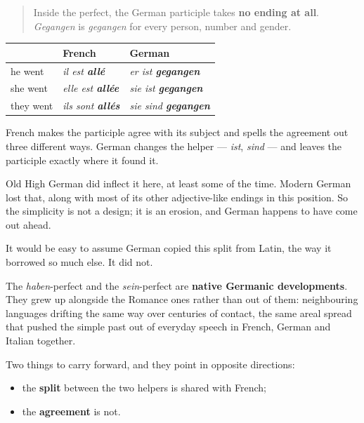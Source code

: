 \begin{grammarlens}[title={Grammar Lens: German agrees with nothing here}]
\begin{quote}
Inside the perfect, the German participle takes \textbf{no ending at all}. \emph{Gegangen} is \emph{gegangen} for every person, number and gender.
\end{quote}

\noindent
\begin{tabularx}{\linewidth}{@{}>{\raggedright\arraybackslash}X>{\raggedright\arraybackslash}X>{\raggedright\arraybackslash}X@{}}
\toprule
\textbf{} & \textbf{French} & \textbf{German} \\
\midrule
he went & \emph{il est \textbf{allé}} & \emph{er ist \textbf{gegangen}} \\
she went & \emph{elle est \textbf{allée}} & \emph{sie ist \textbf{gegangen}} \\
they went & \emph{ils sont \textbf{allés}} & \emph{sie sind \textbf{gegangen}} \\
\bottomrule
\end{tabularx}

French makes the participle agree with its subject and spells the agreement out three different ways. German changes the helper — \emph{ist}, \emph{sind} — and leaves the participle exactly where it found it.

Old High German did inflect it here, at least some of the time. Modern German lost that, along with most of its other adjective-like endings in this position. So the simplicity is not a design; it is an erosion, and German happens to have come out ahead.
\end{grammarlens}

\begin{culture}
It would be easy to assume German copied this split from Latin, the way it borrowed so much else. It did not.

The \emph{haben}-perfect and the \emph{sein}-perfect are \textbf{native Germanic developments}. They grew up alongside the Romance ones rather than out of them: neighbouring languages drifting the same way over centuries of contact, the same areal spread that pushed the simple past out of everyday speech in French, German and Italian together.

Two things to carry forward, and they point in opposite directions:

\begin{itemize}
\raggedright
  \item the \textbf{split} between the two helpers is shared with French;
  \item the \textbf{agreement} is not.
\end{itemize}
\end{culture}

